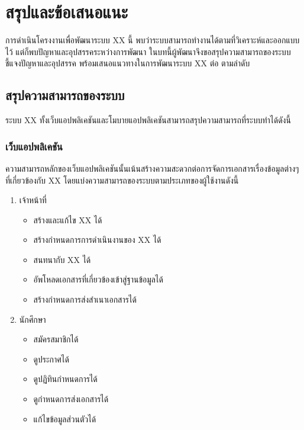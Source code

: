 \chapter{สรุปและข้อเสนอแนะ}

การดำเนินโครงงานเพื่อพัฒนาระบบ XX นี้ พบว่าระบบสามารถทำงานได้ตามที่วิเคราะห์และออกแบบไว้ แต่ก็พบปัญหาและอุปสรรคระหว่างการพัฒนา ในบทนี้ผู้พัฒนาจึงขอสรุปความสามารถของระบบ ชี้แจงปัญหาและอุปสรรค พร้อมเสนอแนวทางในการพัฒนาระบบ XX ต่อ ตามลำดับ

\section{สรุปความสามารถของระบบ}
	ระบบ XX ทั้งเว็บแอปพลิเคชันและโมบายแอปพลิเคชันสามารถสรุปความสามารถที่ระบบทำได้ดังนี้
	\subsection{เว็บแอปพลิเคชัน}
	ความสามารถหลักของเว็บแอปพลิเคชันนั้นเน้นสร้างความสะดวกต่อการจัดการเอกสารเรื่องข้อมูลต่างๆ ที่เกี่ยวข้องกับ XX โดยแบ่งความสามารถของระบบตามประเภทของผู้ใช้งานดังนี้
		\begin{enumerate}
			 \item เจ้าหน้าที่
				 \begin{itemize}
				 	\item สร้างและแก้ไข XX ได้
				 	\item สร้างกำหนดการการดำเนินงานของ XX ได้
				 	\item สนทนากับ XX ได้ 
				 	\item อัพโหลดเอกสารที่เกี่ยวข้องเข้าสู่ฐานข้อมูลได้
				 	\item สร้างกำหนดการส่งสำเนาเอกสารได้
				 \end{itemize}
			\item นักศึกษา
				\begin{itemize}
					\item สมัครสมาชิกได้ 
					\item ดูประกาศได้
					\item ดูปฏิทินกำหนดการได้
					\item ดูกำหนดการส่งเอกสารได้
					\item แก้ไขข้อมูลส่วนตัวได้
				\end{itemize}
		\end{enumerate}

